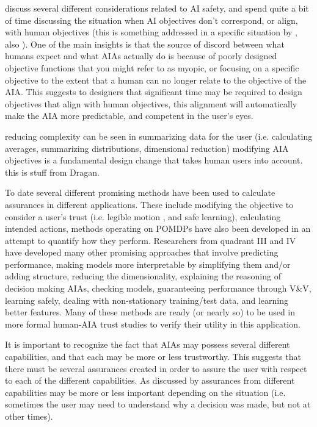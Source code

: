     \citet{Amodei2016-xi} discuss several different considerations related to AI safety, and spend quite a bit of time discussing the situation when AI objectives don't correspond, or align, with human objectives (this is something addressed in a specific situation by \cite{Hadfield-Menell2016-ws}, also \cite{Bostrom2012-uf}). One of the main insights is that the source of discord between what humans expect and what AIAs actually do is because of poorly designed objective functions that you might refer to as myopic, or focusing on a specific objective to the extent that a human can no longer relate to the objective of the AIA. This suggests to designers that significant time may be required to design objectives that align with human objectives, this alignment will automatically make the AIA more predictable, and competent in the user's eyes.

    reducing complexity can be seen in summarizing data for the user (i.e. calculating averages, summarizing distributions, dimensional reduction)
    modifying AIA objectives is a fundamental design change that takes human users into account. this is stuff from Dragan.

    To date several different promising methods have been used to calculate assurances in different applications. These include modifying the objective to consider a user's trust (i.e. legible motion \cite{Dragan2013-wd}, and safe learning), calculating intended actions, methods operating on POMDPs have also been developed in an attempt to quantify how they perform. Researchers from quadrant III and IV have developed many other promising approaches that involve predicting performance, making models more interpretable by simplifying them and/or adding structure, reducing the dimensionality, explaining the reasoning of decision making AIAs, checking models, guaranteeing performance through V\&V, learning safely, dealing with non-stationary training/test data, and learning better features. Many of these methods are ready (or nearly so) to be used in more formal human-AIA trust studies to verify their utility in this application.

    It is important to recognize the fact that AIAs may possess several different capabilities, and that each may be more or less trustworthy. This suggests that there must be several assurances created in order to assure the user with respect to each of the different capabilities. As discussed by \cite{Chen2014-dk} assurances from different capabilities may be more or less important depending on the situation (i.e. sometimes the user may need to understand why a decision was made, but not at other times).

